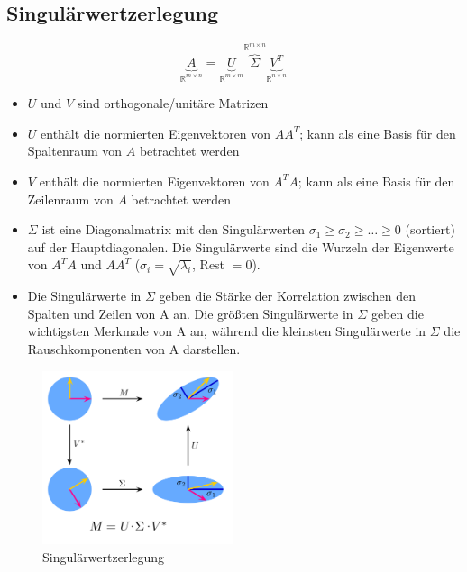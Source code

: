 \subsection{Singulärwertzerlegung}
\label{SVD}
\begin{equation*}
    \underbrace{A}_{\mathbb{R}^{m\times n}} = \underbrace{U}_{\mathbb{R}^{m\times m}} \overbrace{\Sigma}^{\mathbb{R}^{m\times n}} \underbrace{V^T}_{\mathbb{R}^{n\times n}}
\end{equation*}

\begin{itemize}
    \item \(U\) und \(V\) sind orthogonale/unitäre Matrizen
    \item \(U\) enthält die normierten Eigenvektoren von \(AA^T\); kann als eine Basis für den Spaltenraum von \(A\) betrachtet werden
    \item \(V\) enthält die normierten Eigenvektoren von \(A^TA\); kann als eine Basis für den Zeilenraum von \(A\) betrachtet werden
    \item \(\Sigma\) ist eine Diagonalmatrix mit den Singulärwerten \(\sigma_1 \geq \sigma_2 \geq \hdots \geq 0\) (sortiert) auf der Hauptdiagonalen. Die Singulärwerte sind die Wurzeln der Eigenwerte von \(A^TA\) und \(AA^T\) (\(\sigma_i = \sqrt{\lambda_i}\), Rest \(=0\)).    \item Die Singulärwerte in \(\Sigma\) geben die Stärke der Korrelation zwischen den Spalten und Zeilen von A an. Die größten Singulärwerte in \(\Sigma\) geben die wichtigsten Merkmale von A an, während die kleinsten Singulärwerte in \(\Sigma\) die Rauschkomponenten von A darstellen.
\end{itemize}


\begin{figure}[ht]
    \centering
    \includegraphics[width=0.5\textwidth]{lineareAlgebra/1920px-Singular-Value-Decomposition.svg.png}
    \caption{Singulärwertzerlegung }
    \label{fig:svd}
\end{figure}



